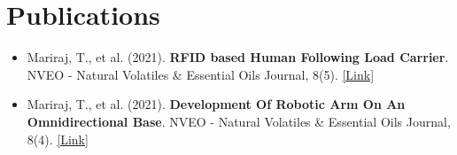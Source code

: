\documentclass[a4paper,11pt]{article}
\begin{document}
\section{Publications}
\vspace{0pt}
\begin{itemize}[itemsep=-2pt, parsep=3pt, leftmargin=0.15in]
    \item\small Mariraj, T., et al. (2021). \textbf{RFID based Human Following Load Carrier}. NVEO - Natural Volatiles \& Essential Oils Journal, 8(5). \href{https://www.nveo.org/index.php/journal/article/view/928}{[Link]}
    \item Mariraj, T., et al. (2021). \textbf{Development Of Robotic Arm On An Omnidirectional Base}. NVEO - Natural Volatiles \& Essential Oils Journal, 8(4). \href{https://www.nveo.org/index.php/journal/article/view/768}{[Link]}
\end{itemize}
\vspace{-10pt}
\end{document}
